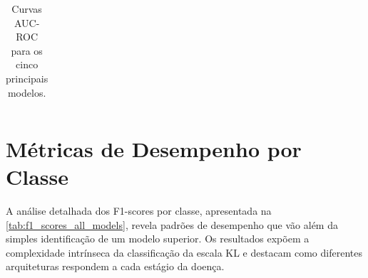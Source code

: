 \begin{table}[!htbp]
\begin{tabular}{|l|c|c|}
    \end{tabular}
    \caption{Curvas AUC-ROC para os cinco principais modelos.}
    \label{tab:curvas_auc_roc}
\end{table}

\section{Métricas de Desempenho por Classe}

A análise detalhada dos F1-scores por classe, apresentada na \autoref{tab:f1_scores_all_models}, revela padrões de desempenho que vão além da simples identificação de um modelo superior. Os resultados expõem a complexidade intrínseca da classificação da escala KL e destacam como diferentes arquiteturas respondem a cada estágio da doença.

